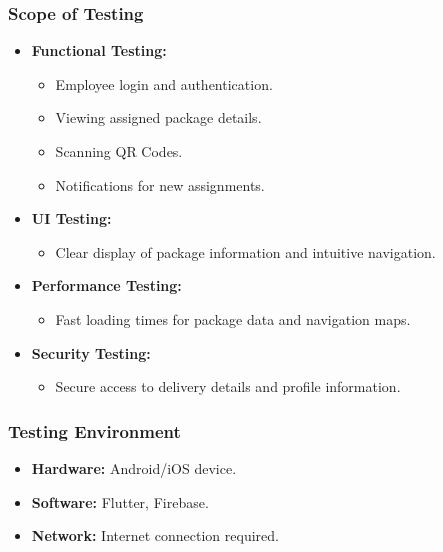 \documentclass{article}
\begin{document}
\subsubsection{Scope of Testing}
\begin{itemize}
    \item \textbf{Functional Testing:}
    \begin{itemize}
        \item Employee login and authentication.
        \item Viewing assigned package details.
        \item Scanning QR Codes.
        \item Notifications for new assignments.
    \end{itemize}
    \item \textbf{UI Testing:}
    \begin{itemize}
        \item Clear display of package information and intuitive navigation.
    \end{itemize}
    \item \textbf{Performance Testing:}
    \begin{itemize}
        \item Fast loading times for package data and navigation maps.
    \end{itemize}
    \item \textbf{Security Testing:}
    \begin{itemize}
        \item Secure access to delivery details and profile information.
    \end{itemize}
\end{itemize}

\subsubsection{Testing Environment}
\begin{itemize}
    \item \textbf{Hardware:} Android/iOS device.
    \item \textbf{Software:} Flutter, Firebase.
    \item \textbf{Network:} Internet connection required.
\end{itemize}
\end{document}
